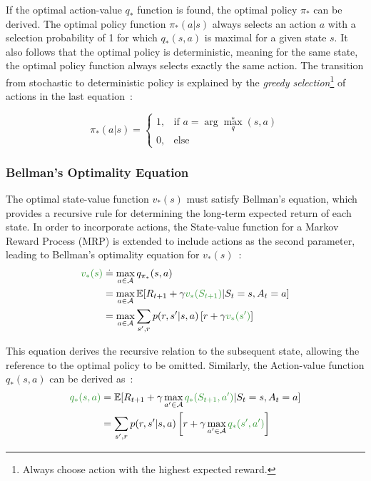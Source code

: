 \documentclass[../xlapes02]{subfiles}
\begin{document}
    If the optimal action-value $q_*$ function is found, the optimal policy $\pi_*$ can be derived. The optimal policy function $\pi_*(a|s)$ always selects an action $a$ with a selection probability of 1 for which $q_*(s, a)$ is maximal for a given state $s$. It also follows that the optimal policy is deterministic, meaning for the same state, the optimal policy function always selects exactly the same action. The transition from stochastic to deterministic policy is explained by the \emph{greedy selection}\footnote{Always choose action with the highest expected reward.} of actions in the last equation~\cite{adamczyk2023bounding, rao2022foundations}:

    \begin{equation}
        \pi_*(a | s) =
        \begin{cases}
            1, & \text{if } a = \arg\max_q^*(s,a) \\
            0, & \text{else}
        \end{cases}
    \end{equation}

    \subsubsection{Bellman's Optimality Equation}\label{subsubsec:bellman-optimality-equation}
    The optimal state-value function $v_*(s)$ must satisfy Bellman's equation, which provides a recursive rule for determining the long-term expected return of each state. In order to incorporate actions, the State-value function for a Markov Reward Process (MRP) is extended to include actions as the second parameter, leading to Bellman's optimality equation for $v_*(s)$~\cite{sutton2018reinforcement}:
    \begin{equation}
        \begin{split}
            \textcolor[RGB]{50,150,50}{v_*(s)}&\doteq\max_{a\in\mathcal{A}}q_{\pi_*}(s,a)\\
            &=\max_{a\in\mathcal{A}}\mathbb{E}[R_{t+1}+\gamma\textcolor[RGB]{50,150,50}{v_*(S_{t+1})}|S_t=s,A_t=a]\\
            &=\max_{a\in\mathcal{A}}\sum_{s',r}p(r,s'|s,a)\left[r+\gamma\textcolor[RGB]{50,150,50}{v_*(s')}\right]
        \end{split}
    \end{equation}

    This equation derives the recursive relation to the subsequent state, allowing the reference to the optimal policy to be omitted. Similarly, the Action-value function $q_*(s, a)$ can be derived as~\cite{sutton2018reinforcement}:
    \begin{equation}
        \begin{split}
            \textcolor[RGB]{50,150,50}{q_*(s, a)}&=\mathbb{E}[R_{t+1}+\gamma\max_{a'\in\mathcal{A}}\textcolor[RGB]{50,150,50}{q_*(S_{t+1},a')}|S_t=s,A_t=a]\\
            &=\sum_{s',r}p(r,s'|s,a)\left[r+\gamma\max_{a'\in\mathcal{A}}\textcolor[RGB]{50,150,50}{q_*(s',a')}\right]
        \end{split}
    \end{equation}
\end{document}
